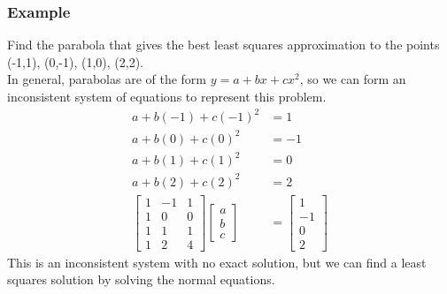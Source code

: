 \documentclass{math}
\begin{document}
\subsubsection*{Example}
Find the parabola that gives the best least squares approximation to the points
(-1,1), (0,-1), (1,0), (2,2). \\
In general, parabolas are of the form \( y = a+bx+cx^2 \), so we can form
an inconsistent system of equations to represent this problem.
\begin{align*}
  a+b(-1)+c(-1)^2 &= 1 \\
  a+b(0)+c(0)^2 &= -1 \\
  a+b(1)+c(1)^2 &= 0 \\
  a+b(2)+c(2)^2 &= 2 \\
  \begin{bmatrix}
    1 & -1 & 1 \\
    1 & 0 & 0 \\
    1 & 1 & 1 \\
    1 & 2 & 4
  \end{bmatrix}\begin{bmatrix}a \\ b \\ c\end{bmatrix} &= \begin{bmatrix}
    1 \\ -1 \\ 0 \\ 2
  \end{bmatrix}
\end{align*}
This is an inconsistent system with no exact solution, but we can find a least
squares solution by solving the normal equations.
\end{document}
